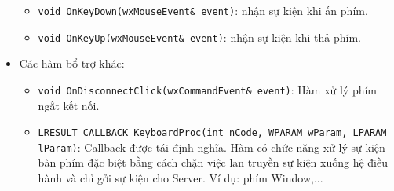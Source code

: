 \begin{itemize}
	\begin{itemize}
		\item[] \lstinline{void OnKeyDown(wxMouseEvent& event)}: nhận sự kiện khi ấn phím.
		\item[] \lstinline{void OnKeyUp(wxMouseEvent& event)}: nhận sự kiện khi thả phím.
	\end{itemize}
	\item Các hàm bổ trợ khác:
		\begin{itemize}
			\item[] \lstinline{void OnDisconnectClick(wxCommandEvent& event)}: Hàm xử lý phím ngắt kết nối.
			\item[] \lstinline{LRESULT CALLBACK KeyboardProc(int nCode, WPARAM wParam, LPARAM lParam)}: Callback được tái định nghĩa. Hàm có chức năng xử lý sự kiện bàn phím đặc biệt bằng cách chặn việc lan truyền sự kiện xuống hệ điều hành và chỉ gởi sự kiện cho Server. Ví dụ: phím Window,...
		\end{itemize}
 \end{itemize}
 
 
